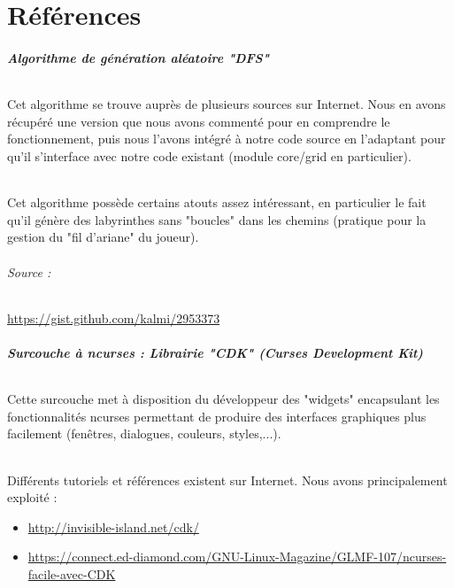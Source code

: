 \documentclass{book}
\begin{document}







\chapter{Références}

\paragraph{Algorithme de génération aléatoire "DFS"}
\subparagraph{}Cet algorithme se trouve auprès de plusieurs sources sur Internet. Nous en avons récupéré une version que nous avons commenté pour en comprendre le fonctionnement, puis nous l'avons intégré à notre code source en l'adaptant pour qu'il s'interface avec notre code existant (module \mbox{core/grid} en particulier).

\subparagraph{}Cet algorithme possède certains atouts assez intéressant, en particulier le fait qu'il génère des labyrinthes sans "boucles" dans les chemins (pratique pour la gestion du "fil d'ariane" du joueur).

\subparagraph{Source :} \url{https://gist.github.com/kalmi/2953373}



\paragraph{Surcouche à ncurses : Librairie "CDK" (Curses Development Kit)}

\subparagraph{}Cette surcouche met à disposition du développeur des "widgets" encapsulant les fonctionnalités ncurses permettant de produire des interfaces graphiques plus facilement (fenêtres, dialogues, couleurs, styles,...).

\subparagraph{}Différents tutoriels et références existent sur Internet. Nous avons principalement exploité :
\begin{itemize}
	\item \url{http://invisible-island.net/cdk/}
	\item \url{https://connect.ed-diamond.com/GNU-Linux-Magazine/GLMF-107/ncurses-facile-avec-CDK}
\end{itemize}
\end{document}
